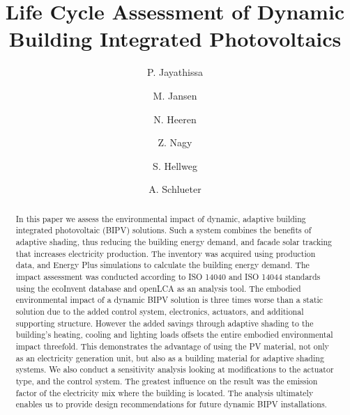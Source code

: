 \documentclass[preprint,12pt]{elsarticle} %
\begin{document}
\begin{frontmatter}

\title{Life Cycle Assessment of Dynamic Building Integrated Photovoltaics} 

\author[ita]{P. Jayathissa }
\address[ita]{Architecture and Building Systems, Institute of Technology in Architecture, Department of Architecture,\\ ETH Zurich, Switzerland} 

\author[ita]{M. Jansen}

\author[baug]{N. Heeren}
\address[baug]{Ecological System Design, Institute of Environmental Engineering,\\ ETH Zurich, Switzerland}

\author[ita]{Z. Nagy}

\author[baug]{S. Hellweg}


\author[ita]{A. Schlueter  }



\begin{abstract}
In this paper we assess the environmental impact of dynamic, adaptive building integrated photovoltaic (BIPV) solutions. Such a system combines the benefits of adaptive shading, thus reducing the building energy demand, and facade solar tracking that increases electricity production. The inventory was acquired using production data, and Energy Plus simulations to calculate the building energy demand. The impact assessment was conducted according to ISO 14040 and ISO 14044 standards using the ecoInvent database and openLCA as an analysis tool. The embodied environmental impact of a dynamic BIPV solution is three times worse than a static solution due to the added control system, electronics, actuators, and additional supporting structure. However the added savings through adaptive shading to the building's heating, cooling and lighting loads offsets the entire embodied environmental impact threefold. This demonstrates the advantage of using the PV material, not only as an electricity generation unit, but also as a building material for adaptive shading systems. We also conduct a sensitivity analysis looking at modifications to the actuator type, and the control system. The greatest influence on the result was the emission factor of the electricity mix where the building is located. The analysis ultimately enables us to provide design recommendations for future dynamic BIPV installations. 


\end{abstract}
\end{frontmatter}
\end{document}
